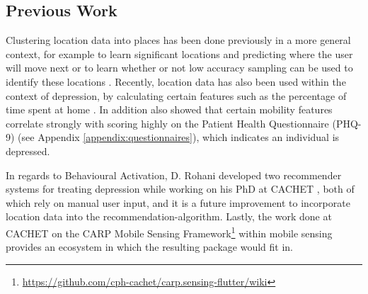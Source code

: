 \subsection*{Previous Work}
Clustering location data into places has been done previously in a more general context, for example to learn significant locations and predicting where the user will move next \cite{learning_significant_locations} or to learn whether or not low accuracy sampling can be used to identify these locations \cite{sparse-location-2014}. Recently, location data has also been used within the context of depression, by calculating certain features such as the percentage of time spent at home \cite{Saeb2015, Canzian2015}. In addition \cite{Saeb2015} also showed that certain mobility features correlate strongly with scoring highly on the Patient Health Questionnaire (PHQ-9) (see Appendix \ref{appendix:questionnaires}), which indicates an individual is depressed.  

In regards to Behavioural Activation, D. Rohani developed two recommender systems for treating depression while working on his PhD at CACHET \cite{mubs-rohani, moribus}, both of which rely on manual user input, and it is a future improvement to incorporate location data into the recommendation-algorithm. Lastly, the work done at CACHET on the CARP Mobile Sensing Framework\footnote{\url{https://github.com/cph-cachet/carp.sensing-flutter/wiki}} within mobile sensing provides an ecosystem in which the resulting package would fit in.